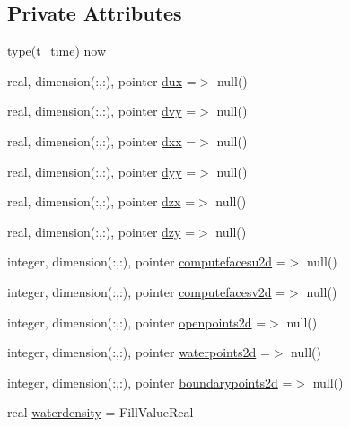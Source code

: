 \subsection*{Private Attributes}
\begin{DoxyCompactItemize}
\item 
type(t\+\_\+time) \mbox{\hyperlink{structmodulesand_1_1t__external_a92152d5bbabf3bd7036467590e28eef2}{now}}
\item 
real, dimension(\+:,\+:), pointer \mbox{\hyperlink{structmodulesand_1_1t__external_aeab91f571bbdd1f1a4095403db6a5a62}{dux}} =$>$ null()
\item 
real, dimension(\+:,\+:), pointer \mbox{\hyperlink{structmodulesand_1_1t__external_a94b7dd4b239a11f9bcb4970adcbad88b}{dvy}} =$>$ null()
\item 
real, dimension(\+:,\+:), pointer \mbox{\hyperlink{structmodulesand_1_1t__external_aaf56dcfb86636d45e1a5029c3411fa18}{dxx}} =$>$ null()
\item 
real, dimension(\+:,\+:), pointer \mbox{\hyperlink{structmodulesand_1_1t__external_a77f2d4f60e84feaf595088b98b666058}{dyy}} =$>$ null()
\item 
real, dimension(\+:,\+:), pointer \mbox{\hyperlink{structmodulesand_1_1t__external_a5aad97c65bb7edf658e7f182ea6f215d}{dzx}} =$>$ null()
\item 
real, dimension(\+:,\+:), pointer \mbox{\hyperlink{structmodulesand_1_1t__external_a5225e8676616efd16afda33845e1712c}{dzy}} =$>$ null()
\item 
integer, dimension(\+:,\+:), pointer \mbox{\hyperlink{structmodulesand_1_1t__external_a7574cb604dc35078682fca63cde44a93}{computefacesu2d}} =$>$ null()
\item 
integer, dimension(\+:,\+:), pointer \mbox{\hyperlink{structmodulesand_1_1t__external_af84da4418226282a95fa011608f5e009}{computefacesv2d}} =$>$ null()
\item 
integer, dimension(\+:,\+:), pointer \mbox{\hyperlink{structmodulesand_1_1t__external_aab0fd7c06e117b351ad74fc285e7a93f}{openpoints2d}} =$>$ null()
\item 
integer, dimension(\+:,\+:), pointer \mbox{\hyperlink{structmodulesand_1_1t__external_a90f6388e0b22c90a5d8d892e0542a1d1}{waterpoints2d}} =$>$ null()
\item 
integer, dimension(\+:,\+:), pointer \mbox{\hyperlink{structmodulesand_1_1t__external_a8f2b5a825b52d42ed38e2d5527c2918e}{boundarypoints2d}} =$>$ null()
\item 
real \mbox{\hyperlink{structmodulesand_1_1t__external_afa3b1f7889d04c192b28419a6ff1909d}{waterdensity}} = Fill\+Value\+Real

\end{DoxyCompactItemize}
